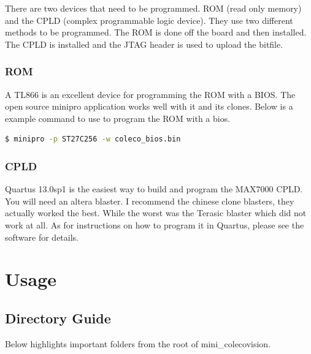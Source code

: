 \par
There are two devices that need to be programmed. ROM (read only memory) and the CPLD (complex programmable logic device).
They use two different methods to be programmed. The ROM is done off the board and then installed. The CPLD is installed
and the JTAG header is used to upload the bitfile.

\subsubsection{ROM}

\par
A TL866 is an excellent device for programming the ROM with a BIOS. The open source minipro application works well with it and
its clones. Below is a example command to use to program the ROM with a bios.

  \begin{lstlisting}[language=bash]
$ minipro -p ST27C256 -w coleco_bios.bin
  \end{lstlisting}

\subsubsection{CPLD}

\par
Quartus 13.0sp1 is the easiest way to build and program the MAX7000 CPLD. You will need an altera blaster.
I recommend the chinese clone blasters, they actually worked the best. While the worst was the Terasic blaster
which did not work at all. As for instructions on how to program it in Quartus, please see the software for details.

\newpage

\section{Usage}

\subsection{Directory Guide}

\par
Below highlights important folders from the root of mini\_colecovision.

